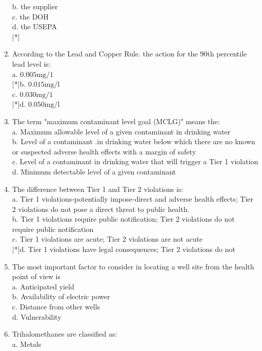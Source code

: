 \begin{enumerate}
b. the supplier\\
c. the DOH\\
d. the USEPA\\
|*|\item According to the Lead and Copper Rule. the action for the 90th percentile lead level is:\\
a. $0.005 \mathrm{mg} / 1$\\
|*|b. $0.015 \mathrm{mg} / \mathrm{l}$\\
c. $0.030 \mathrm{mg} / 1$\\
|*|d. $0.050 \mathrm{mg} / \mathrm{l}$\\
\item The term "maximum contaminant level goal (MCLG)" means the:\\
a. Maximum allowable level of a given contaminant in drinking water\\
b. Level of a contaminant .in drinking water below which there are no known or suspected adverse health effects with a margin of safety\\
c. Level of a contaminant in drinking water that will trigger a Tier 1 violation\\
d. Minimum detectable level of a given contaminant\\
\item The difference between Tier 1 and Tier 2 violations is:\\
a. Tier 1 violations-potentially impose-direct and adverse health effects; Tier 2 violations do not pose a direct threat to public health.\\
b. Tier 1 violations require public notification; Tier 2 violations do not require public notification\\ c. Tier 1 violations are acute; Tier 2 violations are not acute\\
|*|d. Tier 1 violations have legal consequences; Tier 2 violations do not\\
\item The most important factor to consider in locating a well site from the health point of view is\\
a. Anticipated yield\\
b. Availability of electric power\\
c. Distance from other wells\\
d. Vulnerability\\
\item Trihalomethanes are classified as:\\
a. Metals\\

\end{enumerate}
